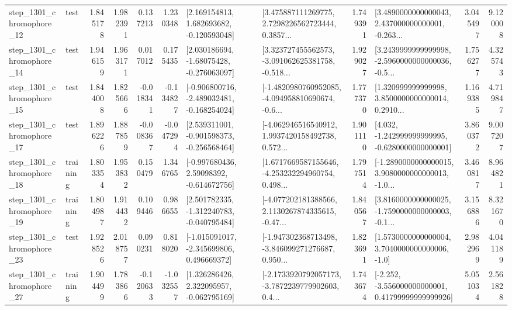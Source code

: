 \begin{tabular}{llrrrrllrlrr}
 step\_1301\_chromophore\_12 &      test &      1.845178 &    1.982391 &      0.137213 &  1.230348 &    [2.169154813, 1.682693682, -0.120593048] &  [3.475887111269775, 2.7298226562723444, 0.3857... &       1.749391 &  [3.4890000000000043, 2.437000000000001, -0.263... &            3.045497 &          9.120008 \\
 step\_1301\_chromophore\_14 &      test &      1.946159 &    1.963171 &      0.017012 &  0.175435 &    [2.030186694, -1.68075428, -0.276063097] &  [3.323727455562573, -3.091062625381758, -0.518... &       1.929027 &  [3.2439999999999998, -2.5960000000000036, -0.5... &            1.756277 &          4.325743 \\
 step\_1301\_chromophore\_15 &      test &      1.844008 &    1.825666 &     -0.018341 & -0.134827 &  [-0.906800716, -2.489032481, -0.168254024] &  [-1.4820980760952085, -4.094958810690674, -0.6... &       1.777370 &  [1.320999999999998, 3.8500000000000014, 0.2910... &            1.169385 &          4.719847 \\
 step\_1301\_chromophore\_17 &      test &      1.896226 &    1.887859 &     -0.008367 & -0.047294 &   [2.539311001, -0.901598373, -0.256568464] &  [-4.062946516540912, 1.9937420158492738, 0.572... &       1.901110 &   [4.032, -1.242999999999995, -0.6280000000000001] &            3.860372 &          9.007207 \\
 step\_1301\_chromophore\_18 &  training &      1.803354 &    1.953832 &      0.150479 &  1.346765 &    [-0.997680436, 2.59098392, -0.614672756] &  [1.6717669587155646, -4.253232294960754, 0.498... &       1.797514 &  [-1.2890000000000015, 3.9080000000000013, -1.0... &            3.460817 &          8.964821 \\
 step\_1301\_chromophore\_19 &  training &      1.804987 &    1.914432 &      0.109446 &  0.986655 &   [2.501782335, -1.312240783, -0.040795484] &  [-4.077202181388566, 2.1130267874335615, -0.47... &       1.840567 &  [3.8160000000000025, -1.7590000000000003, -0.1... &            3.156886 &          8.321670 \\
 step\_1301\_chromophore\_23 &      test &      1.928526 &    2.018757 &      0.090231 &  0.818020 &   [-1.015091017, -2.345699806, 0.496669372] &  [-1.947302368713498, -3.846099271276687, 0.950... &       1.823691 &     [1.5730000000000004, 3.7040000000000006, -1.0] &            2.982969 &          4.041189 \\
 step\_1301\_chromophore\_27 &  training &      1.904499 &    1.783866 &     -0.120633 & -1.032557 &    [1.326286426, 2.322095957, -0.062795169] &  [-2.1733920792057173, -3.7872239779902603, 0.4... &       1.743674 &  [-2.252, -3.556000000000001, 0.41799999999999926] &            5.051034 &          2.561828 \\

\end{tabular}
